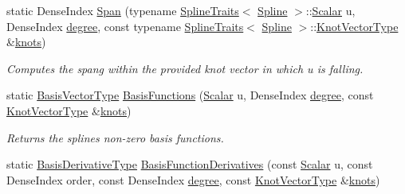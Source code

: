 \begin{DoxyCompactItemize}
\item 
\mbox{\label{group___splines___module_aaba7632c61b84194e890696c2b57be1b}} 
static Dense\+Index \hyperlink{group___splines___module_aaba7632c61b84194e890696c2b57be1b}{Span} (typename \hyperlink{struct_eigen_1_1_spline_traits}{Spline\+Traits}$<$ \hyperlink{group___splines___module_class_eigen_1_1_spline}{Spline} $>$\+::\hyperlink{group___splines___module_a8cafd78b564825c76fbb3419653d9742}{Scalar} u, Dense\+Index \hyperlink{group___splines___module_a0df23e941ac0f31dcd095a4dd4f4a7ec}{degree}, const typename \hyperlink{struct_eigen_1_1_spline_traits}{Spline\+Traits}$<$ \hyperlink{group___splines___module_class_eigen_1_1_spline}{Spline} $>$\+::\hyperlink{group___splines___module_a066f7a8b120316c9068b559f0790e9ec}{Knot\+Vector\+Type} \&\hyperlink{group___splines___module_ae3eac8af580ad880d8ad3a259d453aa1}{knots})
\begin{DoxyCompactList}\small\item\em Computes the spang within the provided knot vector in which u is falling. \end{DoxyCompactList}\item 
static \hyperlink{group___splines___module_a1d49cef942ea59d85d1711ee32354e6b}{Basis\+Vector\+Type} \hyperlink{group___splines___module_a038506788499d71aedddc5211c33bb6e}{Basis\+Functions} (\hyperlink{group___splines___module_a8cafd78b564825c76fbb3419653d9742}{Scalar} u, Dense\+Index \hyperlink{group___splines___module_a0df23e941ac0f31dcd095a4dd4f4a7ec}{degree}, const \hyperlink{group___splines___module_a066f7a8b120316c9068b559f0790e9ec}{Knot\+Vector\+Type} \&\hyperlink{group___splines___module_ae3eac8af580ad880d8ad3a259d453aa1}{knots})
\begin{DoxyCompactList}\small\item\em Returns the spline\textquotesingle{}s non-\/zero basis functions. \end{DoxyCompactList}\item 
static \hyperlink{group___splines___module_a9db0b0108353660cd03524f2e67d6b3c}{Basis\+Derivative\+Type} \hyperlink{group___splines___module_a2e42e79b08b560007062b8f56689ae24}{Basis\+Function\+Derivatives} (const \hyperlink{group___splines___module_a8cafd78b564825c76fbb3419653d9742}{Scalar} u, const Dense\+Index order, const Dense\+Index \hyperlink{group___splines___module_a0df23e941ac0f31dcd095a4dd4f4a7ec}{degree}, const \hyperlink{group___splines___module_a066f7a8b120316c9068b559f0790e9ec}{Knot\+Vector\+Type} \&\hyperlink{group___splines___module_ae3eac8af580ad880d8ad3a259d453aa1}{knots})

\end{DoxyCompactItemize}
